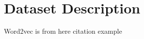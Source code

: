 \section{Dataset Description}
\label{sec:dataset}
Word2vec is from here \cite{mikolov2013distributed} citation example


